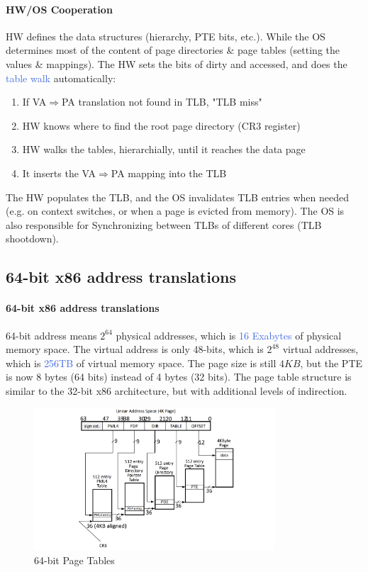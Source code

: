 \documentclass[openany,12pt]{book}
\newcommand{\blue}[1]{\textcolor{RoyalBlue}{#1}}
\begin{document}
\paragraph{HW/OS Cooperation} HW defines the data structures (hierarchy, PTE bits, etc.). While the OS determines most of the content of page directories \& page tables (setting the values \& mappings). The HW sets the bits of dirty and accessed, and does the \blue{table walk} automatically:
\begin{enumerate}
  \item If VA\(\Longrightarrow\)PA translation not found in TLB, "TLB miss"
  \item HW knows where to find the root page directory (CR3 register)
  \item HW walks the tables, hierarchially, until it reaches the data page
  \item It inserts the VA\(\Longrightarrow\)PA mapping into the TLB
\end{enumerate}
The HW populates the TLB, and the OS invalidates TLB entries when needed (e.g. on context switches, or when a page is evicted from memory). The OS is also responsible for Synchronizing between TLBs of different cores (TLB shootdown).


\subsection*{64-bit x86 address translations}
\paragraph{64-bit x86 address translations} 64-bit address means \(2^{64}\) physical addresses, which is \blue{16 Exabytes} of physical memory space. The virtual address is only 48-bits, which is \(2^{48}\) virtual addresses, which is \blue{256TB} of virtual memory space. The page size is still \(4KB\), but the PTE is now 8 bytes (64 bits) instead of 4 bytes (32 bits). The page table structure is similar to the 32-bit x86 architecture, but with additional levels of indirection.

\begin{figure}[H]
    \centering
    \includegraphics[width=0.8\textwidth]{64bit-tables.png}
    \caption{64-bit Page Tables}
\end{figure}
\end{document}
